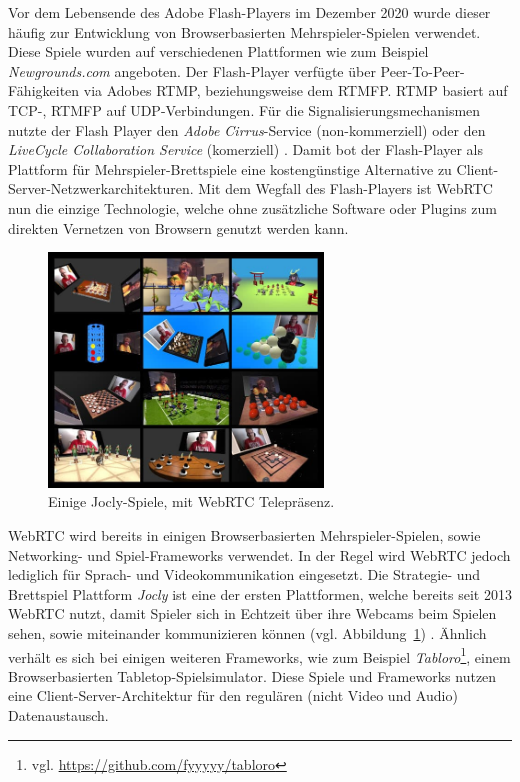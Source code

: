 Vor dem Lebensende des Adobe Flash-Players im Dezember 2020 wurde dieser häufig zur Entwicklung von Browserbasierten Mehrspieler-Spielen verwendet. Diese Spiele wurden auf verschiedenen Plattformen wie zum Beispiel \textit{Newgrounds.com} angeboten. Der Flash-Player verfügte über Peer-To-Peer-Fähigkeiten via Adobes \acf{RTMP}, beziehungsweise dem \acf{RTMFP}. \acs{RTMP} basiert auf \acs{TCP}-, \acs{RTMFP} auf \acs{UDP}-Verbindungen. Für die Signalisierungsmechanismen nutzte der Flash Player den \textit{Adobe Cirrus}-Service (non-kommerziell) oder den \textit{LiveCycle Collaboration Service} (komerziell) \cite{adobep2p}. Damit bot der Flash-Player als Plattform für Mehrspieler-Brettspiele eine kostengünstige Alternative zu Client-Server-Netzwerkarchitekturen. Mit dem Wegfall des Flash-Players ist WebRTC nun die einzige Technologie, welche ohne zusätzliche Software oder Plugins zum direkten Vernetzen von Browsern genutzt werden kann.

\begin{figure}[h]
\centering
\includegraphics[width=0.65\textwidth]{bilder/jocly-games.jpg}
\caption{Einige Jocly-Spiele, mit WebRTC Telepräsenz.}
\label{fig:jocly}
\end{figure}

\acs{WebRTC} wird bereits in einigen Browserbasierten Mehrspieler-Spielen, sowie Networking- und Spiel-Frameworks verwendet. In der Regel wird WebRTC jedoch lediglich für Sprach- und Videokommunikation eingesetzt. Die Strategie- und Brettspiel Plattform \textit{Jocly} ist eine der ersten Plattformen, welche bereits seit 2013 \acs{WebRTC} nutzt, damit Spieler sich in Echtzeit über ihre Webcams beim Spielen sehen, sowie miteinander kommunizieren können (vgl. Abbildung~\ref{fig:jocly}) \cite{jocly2013}. Ähnlich verhält es sich bei einigen weiteren Frameworks, wie zum Beispiel \textit{Tabloro}\footnote{vgl. \url{https://github.com/fyyyyy/tabloro}}, einem Browserbasierten \glqq{}Tabletop\grqq{}-Spielsimulator. Diese Spiele und Frameworks nutzen eine Client-Server-Architektur für den regulären (nicht Video und Audio) Datenaustausch.

